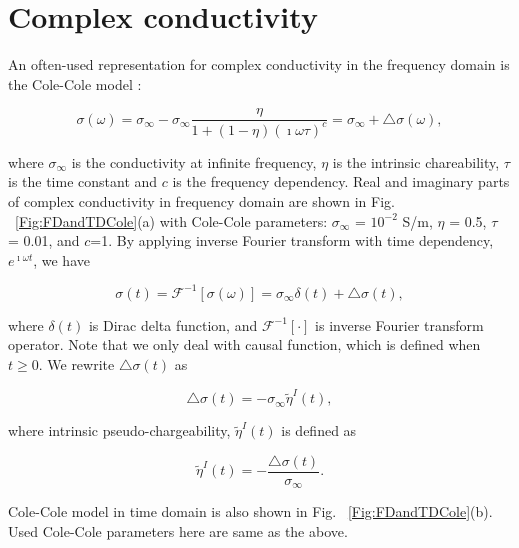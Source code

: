 \documentclass[extra,mreferee]{gji}
\newcommand{\siginf}{\sigma_\infty}
\newcommand{\dsig}{\triangle\sigma}
\newcommand{\peta}{\tilde{\eta}}
\begin{document}
\section{Complex conductivity}
An often-used representation for complex conductivity in the frequency domain is the Cole-Cole model \cite[]{COLE}:
\begin{linenomath*}
\begin{equation}
  \sigma(\omega) = \sigma_{\infty} - \sigma_{\infty}\frac{\eta}{1+(1-\eta)(\imath\omega\tau)^c} = \sigma_{\infty} + \triangle\sigma(\omega),
  \label{eq: sigma_freq}
\end{equation}
\end{linenomath*}
where $\sigma_{\infty}$ is the conductivity at infinite frequency, $\eta$ is the intrinsic chareability, $\tau$ is the time constant and $c$ is the frequency dependency. Real and imaginary parts of complex conductivity in frequency domain are shown in Fig. ~\ref{Fig:FDandTDCole}(a) with Cole-Cole parameters: $\siginf$ = $10^{-2}$ S/m, $\eta $ = 0.5, $\tau$ = 0.01, and $c$=1. By applying inverse Fourier transform with time dependency, $e^{\imath\omega t}$, we have
\begin{linenomath*}
\begin{equation}
  \sigma(t) = \mathscr{F}^{-1}[\sigma(\omega)] = \sigma_{\infty}\delta(t) + \triangle\sigma(t),
  \label{eq: sigma_time}
\end{equation}
\end{linenomath*}
where $\delta(t)$ is Dirac delta function, and $\mathscr{F}^{-1}[\cdot]$ is inverse Fourier transform operator. Note that we only deal with causal function, which is defined when $t\ge 0$. 
We rewrite $\dsig(t)$ as 
\begin{linenomath*}
\begin{equation}
  \dsig(t) = - \siginf\peta^{I}(t),
  \label{eq: sigma_time_c1}
\end{equation}
\end{linenomath*}
where intrinsic pseudo-chargeability, $\peta^{I}(t)$ is defined as
\begin{linenomath*}
\begin{equation}
    \peta^{I}(t) = -\frac{\dsig(t)}{\siginf}. %
    \label{eq: intrinsic_peta}
\end{equation}
\end{linenomath*}
Cole-Cole model in time domain is also shown in Fig. ~\ref{Fig:FDandTDCole}(b). Used Cole-Cole parameters here are same as the above.
\end{document}
